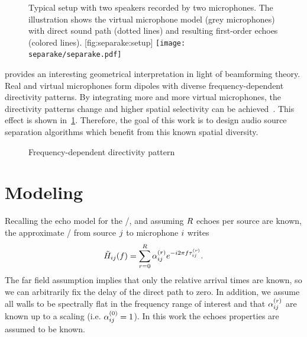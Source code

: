 \begin{figure}[t]
    \begin{sidecaption}{%
        Typical setup with two speakers recorded by two microphones.
        The illustration shows the virtual microphone model (grey microphones) with direct sound path (dotted lines) and resulting first-order echoes (colored lines).
        }[fig:separake:setup]
    \centering
    \texttt{[image: separake/separake.pdf]}
    \end{sidecaption}
\end{figure}

 provides an interesting geometrical interpretation in light of beamforming theory.
Real and virtual microphones form dipoles with diverse frequency-dependent directivity patterns.
By integrating more and more virtual microphones, the directivity patterns change and higher spatial selectivity can be achieved~.
This effect is shown in~\cref{fig:separake:directivity}.
Therefore, the goal of this work is to design audio source separation algorithms which benefit from this known spatial diversity.
\begin{figure}[b]
    \begin{fullwidth}
    \centering
    
    \label{fig:separake:directivity}
    \caption{Frequency-dependent directivity pattern }
    \end{fullwidth}
\end{figure}

\section{Modeling}
Recalling the echo model for the \RIRs/, and assuming $R$ echoes per source are known, the approximate \RTFdef/ from source $j$ to microphone $i$ writes
\begin{equation}
    \label{eq:separake:approx_tf}
    \tilde{H}_{ij}(f) = \sum_{r=0}^{R} \alpha_{ij}^{(r)} {e}^{-{i} 2 \pi f \tau_{ij}^{(r)}}.
\end{equation}
The far field assumption implies that only the relative arrival times are known, so we can arbitrarily fix the delay of the direct path to zero.
In addition, we assume all walls to be spectrally flat in the frequency range of interest and that $\alpha_{ij}^{(r)}$ are known up to a scaling (i.e. $\alpha_{ij}^{(0)} = 1$).
In this work the echoes properties are assumed to be known.

